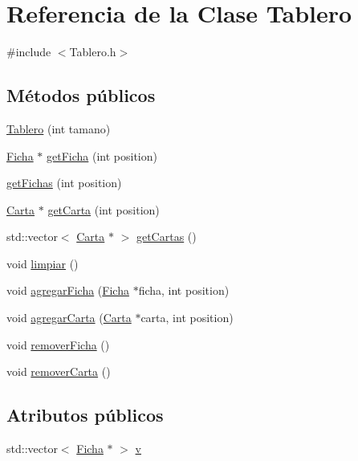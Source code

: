 \hypertarget{class_tablero}{\section{Referencia de la Clase Tablero}
\label{class_tablero}
}


{\ttfamily \#include $<$Tablero.\-h$>$}

\subsection*{Métodos públicos}
\begin{DoxyCompactItemize}
\item 
\hyperlink{class_tablero_ab79dbca4e20297413f85c91b50fe0851}{Tablero} (int tamano)
\item 
\hyperlink{class_ficha}{Ficha} $\ast$ \hyperlink{class_tablero_a8a6f167e3747816295c675a01e00bfcf}{get\-Ficha} (int position)
\item 
\hyperlink{class_tablero_a988b7952a2f3762b91da67d82f747640}{get\-Fichas} (int position)
\item 
\hyperlink{class_carta}{Carta} $\ast$ \hyperlink{class_tablero_a53e7898baa2b76a8170f4a97cb410bfe}{get\-Carta} (int position)
\item 
std\-::vector$<$ \hyperlink{class_carta}{Carta} $\ast$ $>$ \hyperlink{class_tablero_a2d26b1f5a080a81136e277cea180a677}{get\-Cartas} ()
\item 
void \hyperlink{class_tablero_a3e22c81bc8928740c016cf20f131244f}{limpiar} ()
\item 
void \hyperlink{class_tablero_ac66871dc14e859b47ebfb9259b5108c5}{agregar\-Ficha} (\hyperlink{class_ficha}{Ficha} $\ast$ficha, int position)
\item 
void \hyperlink{class_tablero_ae07891d65454d1bfbe2f49a577b12d43}{agregar\-Carta} (\hyperlink{class_carta}{Carta} $\ast$carta, int position)
\item 
void \hyperlink{class_tablero_a7f1f074d18683cc417de3e844f2ed894}{remover\-Ficha} ()
\item 
void \hyperlink{class_tablero_a6b9e30801fe6bbc68b8491bb7bbad3ea}{remover\-Carta} ()
\end{DoxyCompactItemize}
\subsection*{Atributos públicos}
\begin{DoxyCompactItemize}
\item 
std\-::vector$<$ \hyperlink{class_ficha}{Ficha} $\ast$ $>$ \hyperlink{class_tablero_a65840b6ef12dbef0f3f17a4bbd592e36}{v}
\end{DoxyCompactItemize}
